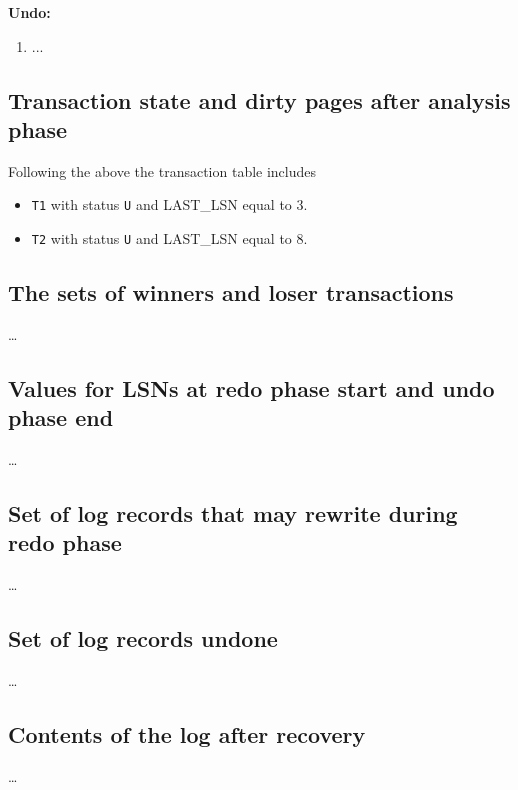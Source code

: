 \noindent
{\bf Undo:}

\begin{enumerate}
\item ...
\end{enumerate}

\subsection{Transaction state and dirty pages after analysis phase}
Following the above the transaction table includes
\begin{itemize}
\item {\tt T1} with status {\tt U} and LAST\_LSN equal to 3.
\item {\tt T2} with status {\tt U} and LAST\_LSN equal to 8.
\end{itemize}

\subsection{The sets of winners and loser transactions}
\dots

\subsection{Values for LSNs at redo phase start and undo phase end}
\dots

\subsection{Set of log records that may rewrite during redo phase}
\dots

\subsection{Set of log records undone}
\dots

\subsection{Contents of the log after recovery}
\dots

